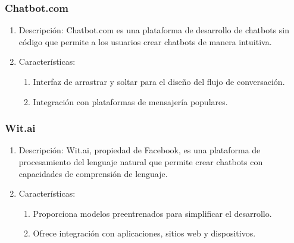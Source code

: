 \subsubsection{Chatbot.com}
\begin{enumerate}
\item Descripción: Chatbot.com es una plataforma de desarrollo de chatbots sin código que permite a los usuarios crear chatbots de manera intuitiva.
\item Características:
\begin{enumerate}
\item Interfaz de arrastrar y soltar para el diseño del flujo de conversación.
\item Integración con plataformas de mensajería populares.
\end{enumerate}
\end{enumerate}

\subsubsection{Wit.ai}
\begin{enumerate}
\item Descripción: Wit.ai, propiedad de Facebook, es una plataforma de procesamiento del lenguaje natural que permite crear chatbots con capacidades de comprensión de lenguaje.
\item Características:
\begin{enumerate}
\item Proporciona modelos preentrenados para simplificar el desarrollo.
\item Ofrece integración con aplicaciones, sitios web y dispositivos.
\end{enumerate}
\end{enumerate}


